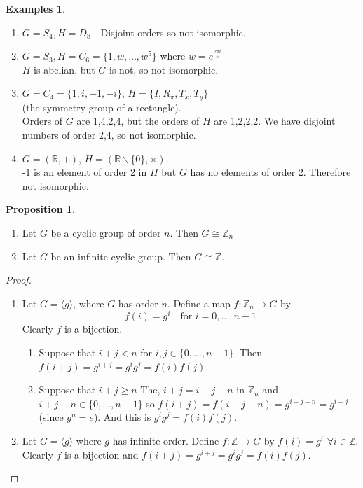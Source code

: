 \documentclass{article}
\theoremstyle{definition}
\newtheorem{proposition}[theorem]{Proposition}
\newtheorem*{exmps}{Examples}
\newcommand{\reals}{\mathbb{R}}
\newcommand{\but}[2]{#1 \backslash \{#2\}}
\newcommand{\ism}{\cong}
\begin{document}
\begin{exmps}\hfill
\begin{enumerate}
  \item $G=S_4, H=D_8$ - Disjoint orders so not isomorphic.
  \item $G=S_3, H=C_6=\{1,w,\ldots,w^5\}$ where $w=e^{\frac{2 \pi i}{6}}$\\ $H$ is abelian, but $G$ is not, so not isomorphic.
  \item $G=C_4=\{1,i,-1,-i\}$, $H=\{I,R_\pi,T_x,T_y\}$ \\(the symmetry group of a rectangle). \\ Orders of $G$ are 1,4,2,4, but the orders of $H$ are 1,2,2,2. We have disjoint numbers of order 2,4, so not isomorphic.
  \item $G=(\mathbb{R}, +)$, $H=(\but{\reals}{0}, \times).$\\ -1 is an element of order 2 in $H$ but $G$ has no elements of order 2. Therefore not isomorphic.\\
\end{enumerate}
\end{exmps}

\begin{proposition}\hfill
  \begin{enumerate}
    \item Let $G$ be a cyclic group of order $n$. Then $G \ism \mathbb{Z}_n$
    \item Let $G$ be an infinite cyclic group. Then $G \ism \mathbb{Z}$.
  \end{enumerate}
\end{proposition}

\begin{proof}\hfill
  \begin{enumerate}
    \item Let $G=\langle g \rangle $, where $G$ has order $n$. Define a map $f : \mathbb{Z}_n \rightarrow G$ by 
      $$f(i)=g^i \quad \text{for } i=0,\ldots,n-1$$
    Clearly $f$ is a bijection.
    \begin{enumerate}
      \item Suppose that $i+j<n$ for $i,j \in \{0,\ldots,n-1\}.$ Then $f(i+j)=g^{i+j}=g^i g^j = f(i)f(j)$.
      \item Suppose that $i+j \geq n$ The, $i+j = i+j-n$ in $\mathbb{Z}_n$ and $i+j-n \in \{0,\ldots,n-1\}$ so $f(i+j)=f(i+j-n)=g^{i+j-n}=g^{i+j}$ (since $g^n=e$).
        And this is $g^i g^j = f(i) f(j)$.
    \end{enumerate}
  \item Let $G=\langle g \rangle$ where $g$ has infinite order. Define $f : \mathbb{Z} \rightarrow G$ by $f(i)=g^i$ $\forall i \in \mathbb{Z}$. Clearly $f$ is a bijection and $f(i+j)=g^{i+j}=g^i g^j = f(i) f(j)$.
  \end{enumerate}
\end{proof}
\end{document}
